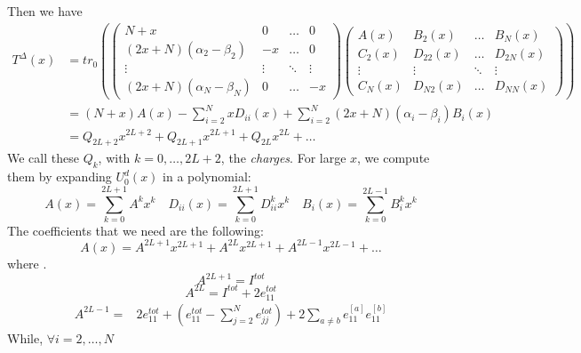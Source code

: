 \documentclass[11pt]{article}
\numberwithin{equation}{section}
\begin{document}
Then we have
\begin{equation}
	\begin{split}
	T^{\Delta}(x)&=tr_{0}\left(\begin{pmatrix}
		N+x&0&\ldots&0\\
		(2x+N)(\alpha_{2}-\beta_{2})&-x&\ldots&0\\
		\vdots&\vdots&\ddots&\vdots\\
		(2x+N)(\alpha_{N}-\beta_{N})&0&\ldots&-x
	\end{pmatrix}\begin{pmatrix}
	A(x)&B_{2}(x)&\ldots&B_{N}(x)\\
	C_{2}(x)&D_{22}(x)&\ldots&D_{2N}(x)\\
	\vdots&\vdots&\ddots&\vdots\\
	C_{N}(x)&D_{N2}(x)&\ldots&D_{NN}(x)
\end{pmatrix}\right)\\&=
(N+x)A(x)-\sum_{i=2}^{N}xD_{ii}(x)+\sum_{i=2}^{N}(2x+N)(\alpha_{i}-\beta_{i})B_{i}(x)\\&=
Q_{2L+2}x^{2L+2}+Q_{2L+1}x^{2L+1}+Q_{2L}x^{2L}+\ldots
\end{split}
\end{equation}
We call these $Q_{k}$, with $k=0,\ldots,2L+2$, the \textit{charges}. For large $x$, we compute them by expanding $U_{0}^{d}(x)$ in a polynomial: 
\begin{equation}
	A(x)=\sum_{k=0}^{2L+1}A^{k}x^{k}\quad D_{ii}(x)=\sum_{k=0}^{2L+1}D_{ii}^{k}x^{k}\quad B_{i}(x)=\sum_{k=0}^{2L-1}B_{i}^{k}x^{k}
\end{equation}
The coefficients that we need are the following:
\begin{equation}
	A(x)=A^{2L+1}x^{2L+1}+A^{2L}x^{2L+1}+A^{2L-1}x^{2L-1}+\ldots
\end{equation}
where .
\begin{equation}
	A^{2L+1}=I^{tot}
\end{equation}
\begin{equation}
	A^{2L}=I^{tot}+2e_{11}^{tot}
\end{equation}
\begin{equation}
	\begin{split}
		A^{2L-1}=&2e_{11}^{tot}+\left(e_{11}^{tot}-\sum_{j=2}^{N}e_{jj}^{tot}\right)+2\sum_{a\neq b}e_{11}^{[a]}e_{11}^{[b]}
	\end{split}
\end{equation}
While, $\forall i=2,\ldots,N$
\end{document}
